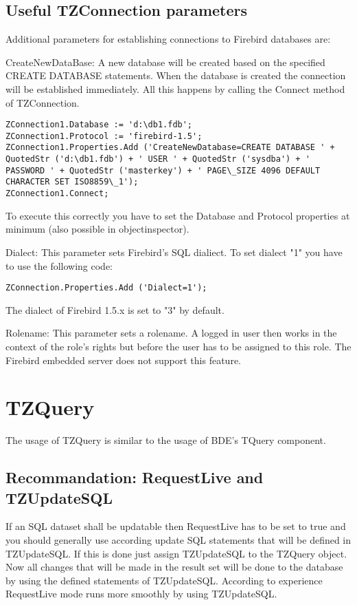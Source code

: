 \documentclass[a4paper,12pt,oneside]{book}
\begin{document}
\subsection{Useful TZConnection parameters}

Additional parameters for establishing connections to Firebird databases are:

CreateNewDataBase:
A new database will be created based on the specified CREATE DATABASE statements.
When the database is created the connection will be established immediately.
All this happens by calling the Connect method of TZConnection.
\begin{verbatim}
ZConnection1.Database := 'd:\db1.fdb';
ZConnection1.Protocol := 'firebird-1.5';
ZConnection1.Properties.Add ('CreateNewDatabase=CREATE DATABASE ' + QuotedStr ('d:\db1.fdb') + ' USER ' + QuotedStr ('sysdba') + ' PASSWORD ' + QuotedStr ('masterkey') + ' PAGE\_SIZE 4096 DEFAULT CHARACTER SET ISO8859\_1');
ZConnection1.Connect;
\end{verbatim}

To execute this correctly you have to set the Database and Protocol properties at minimum (also possible in objectinspector).

Dialect:
This parameter sets Firebird's SQL dialiect. To set dialect "1" you have to use the following code:
\begin{verbatim}
ZConnection.Properties.Add ('Dialect=1');
\end{verbatim}

The dialect of Firebird 1.5.x is set to "3" by default.

Rolename:
This parameter sets a rolename. A logged in user then works in the context of the role's rights but before the user has to be assigned to this role.
The Firebird embedded server does not support this feature.

\section{TZQuery}

The usage of TZQuery is similar to the usage of BDE's TQuery component.

\subsection{Recommandation: RequestLive and TZUpdateSQL}
If an SQL dataset shall be updatable then RequestLive has to be set to true and you should generally use according update SQL statements that will be defined in TZUpdateSQL.
If this is done just assign TZUpdateSQL to the TZQuery object.
Now all changes that will be made in the result set will be done to the database by using the defined statements of TZUpdateSQL.
According to experience RequestLive mode runs more smoothly by using TZUpdateSQL.
\end{document}
